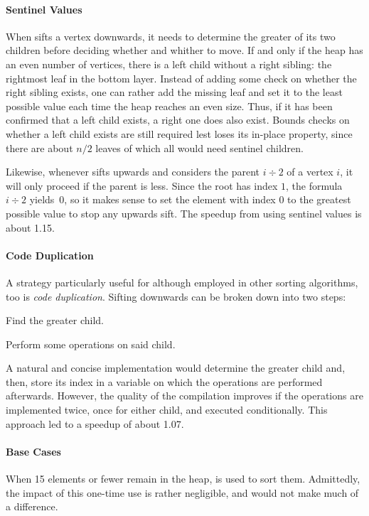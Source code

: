\paragraph{Sentinel Values}
When \HS{} sifts a vertex downwards, it needs to determine the greater of its two children before deciding whether and whither to move.
If and only if the heap has an even number of vertices, there is a left child without a right sibling:
the rightmost leaf in the bottom layer.
Instead of adding some check on whether the right sibling exists, one can rather add the missing leaf and set it to the least possible value each time the heap reaches an even size.
Thus, if it has been confirmed that a left child exists, a right one does also exist.
Bounds checks on whether a left child exists are still required lest \HS{} loses its in-place property, since there are about \(n/2\) leaves of which all would need sentinel children.

Likewise, whenever \HS{} sifts upwards and considers the parent \(i \div 2\) of a vertex \(i\), it will only proceed if the parent is less.
Since the root has index \(1\), the formula \(i \div 2\) yields~\(0\), so it makes sense to set the element with index \(0\) to the greatest possible value to stop any upwards sift.
The speedup from using sentinel values is about \num{1.15}.


\paragraph{Code Duplication}
A strategy particularly useful for \HS{} \Dash although employed in other sorting algorithms, too \Dash is \emph{code duplication}.
Sifting downwards can be broken down into two steps:
\begin{enumerate*}
	\item
	Find the greater child.

	\item
	Perform some operations on said child.
\end{enumerate*}
A natural and concise implementation would determine the greater child and, then, store its index in a variable on which the operations are performed afterwards.
However, the quality of the compilation improves if the operations are implemented twice, once for either child, and executed conditionally.
This approach led to a speedup of about \num{1.07}.


\paragraph{Base Cases}
When 15 elements or fewer remain in the heap, \IS{} is used to sort them.
Admittedly, the impact of this one-time use is rather negligible, and \ShS{} would not make much of a difference.

